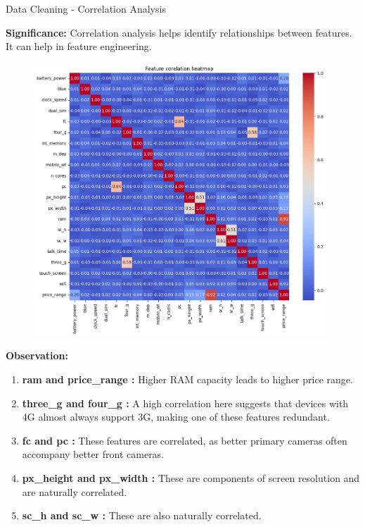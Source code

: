 \documentclass[14pt, aspectratio=169]{beamer}
\begin{document}
\begin{frame}{Data Cleaning - Correlation Analysis}
  \begin{minipage}{0.3\textwidth}    
    \begin{block}{}
      \textbf{Significance:} \small
      Correlation analysis helps identify relationships between features. It can help in feature engineering.
    \end{block}
    \normalsize
  \end{minipage}
  \hfill
  \begin{minipage}{0.6\textwidth}
    \begin{figure}[H]
      \centering
      \includegraphics[width=0.98\textwidth]{../report/corr_viz.png}
    \end{figure}
  \end{minipage}

  \begin{block}{}
    \textbf{Observation:} \small
    \begin{enumerate}
      \setlength\itemsep{.05em}
      \item{\textbf{ram and price\_range :}} Higher RAM capacity leads to higher price range.
      \item{\textbf{three\_g and four\_g :}} A high correlation here suggests that devices with 4G almost always support 3G, making one of these features redundant.
      \item{\textbf{fc and pc :}} These features are correlated, as better primary cameras often accompany better front cameras.
      \item{\textbf{px\_height and px\_width :}} These are components of screen resolution and are naturally correlated.
      \item{\textbf{sc\_h and sc\_w :}} These are also naturally correlated.
    \end{enumerate}
  \end{block}
  

\end{frame}
\end{document}
